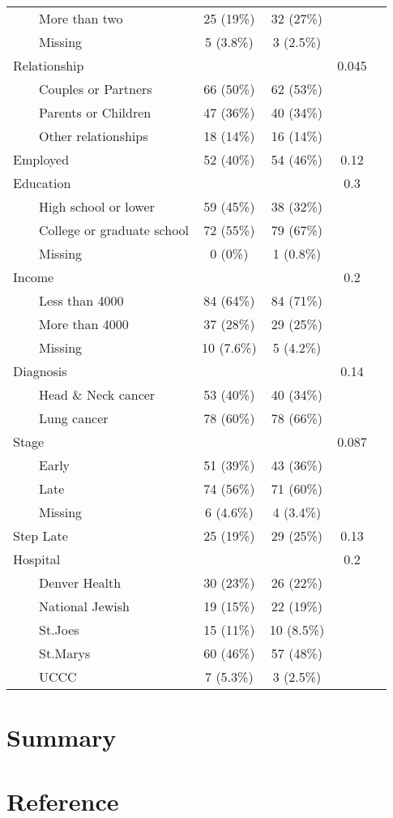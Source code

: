 \documentclass[
  letterpaper,
  DIV=11,
  numbers=noendperiod]{scrreprt}
\begin{document}
\begin{tabular}{lcccc}
   \ \ \ \ More than two & 25 (19\%) & 32 (27\%) &  \\ 
   \ \ \ \ Missing & 5 (3.8\%) & 3 (2.5\%) &  \\
   Relationship &  &  & 0.045 \\ 
   \ \ \ \ Couples or Partners & 66 (50\%) & 62 (53\%) &  \\ 
   \ \ \ \ Parents or Children & 47 (36\%) & 40 (34\%) &  \\ 
   \ \ \ \ Other relationships & 18 (14\%) & 16 (14\%) &  \\ 
   Employed & 52 (40\%) & 54 (46\%) & 0.12 \\ 
   Education &  &  & 0.3 \\ 
   \ \ \ \ High school or lower & 59 (45\%) & 38 (32\%) &  \\ 
   \ \ \ \ College or graduate school & 72 (55\%) & 79 (67\%) &  \\ 
   \ \ \ \ Missing & 0 (0\%) & 1 (0.8\%) &  \\ 
   Income &  &  & 0.2 \\ 
   \ \ \ \ Less than 4000 & 84 (64\%) & 84 (71\%) &  \\
   \ \ \ \ More than 4000 & 37 (28\%) & 29 (25\%) &  \\ 
   \ \ \ \ Missing & 10 (7.6\%) & 5 (4.2\%) &  \\ 
   Diagnosis &  &  & 0.14 \\ 
   \ \ \ \ Head \& Neck cancer & 53 (40\%) & 40 (34\%) &  \\ 
   \ \ \ \ Lung cancer & 78 (60\%) & 78 (66\%) &  \\ 
   Stage &  &  & 0.087 \\ 
   \ \ \ \ Early & 51 (39\%) & 43 (36\%) &  \\ 
   \ \ \ \ Late & 74 (56\%) & 71 (60\%) &  \\ 
   \ \ \ \ Missing & 6 (4.6\%) & 4 (3.4\%) &  \\ 
   Step Late & 25 (19\%) & 29 (25\%) & 0.13 \\ 
   Hospital &  &  & 0.2 \\ 
   \ \ \ \ Denver Health & 30 (23\%) & 26 (22\%) &  \\ 
   \ \ \ \ National Jewish & 19 (15\%) & 22 (19\%) &  \\ 
   \ \ \ \ St.Joes & 15 (11\%) & 10 (8.5\%) &  \\ 
   \ \ \ \ St.Marys & 60 (46\%) & 57 (48\%) &  \\ 
   \ \ \ \ UCCC & 7 (5.3\%) & 3 (2.5\%) &  \\ 
   \hline
\end{tabular}


\hypertarget{summary}{%
\chapter{Summary}\label{summary}}


\hypertarget{reference}{%
\chapter{Reference}\label{reference}}
\end{document}
